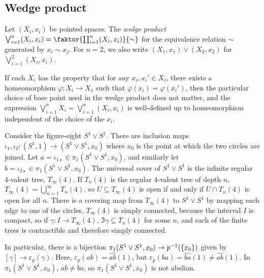 \subsection{Wedge product}
\begin{definition}
	Let \( (X_i, x_i) \) be pointed spaces.
	The \emph{wedge product} \( \bigvee_{i=1}^n (X_i, x_i) = \faktor{\coprod_{i=1}^n (X_i, x_i)}{\sim} \) for the equivalence relation \( \sim \) generated by \( x_i \sim x_j \).
	For \( n = 2 \), we also write \( (X_1, x_1) \vee (X_2, x_2) \) for \( \bigvee_{i=1}^2 (X_i, x_i) \).
\end{definition}
If each \( X_i \) has the property that for any \( x_i, x_i' \in X_i \), there exists a homeomorphism \( \varphi \colon X_i \to X_1 \) such that \( \varphi(x_i) = \varphi(x_i') \), then the particular choice of base point used in the wedge product does not matter, and the expression \( \bigvee_{i=1}^n X_i = \bigvee_{i=1}^n (X_i, x_i) \) is well-defined up to homeomorphism independent of the choice of the \( x_i \).
\begin{example}
	Consider the figure-eight \( S^1 \vee S^1 \).
	There are inclusion maps \( \iota_1, \iota_2 \colon (S^1,1) \to (S^1 \vee S^1, x_0) \) where \( x_0 \) is the point at which the two circles are joined.
	Let \( a = \iota_{1\star} \in \pi_1(S^1 \vee S^1,x_0) \), and similarly let \( b = \iota_{2\star} \in \pi_1(S^1 \vee S^1,x_0) \).
	The universal cover of \( S^1 \vee S^1 \) is the infinite regular 4-valent tree, \( T_\infty(4) \).
	If \( T_n(4) \) is the regular 4-valent tree of depth \( n \), \( T_\infty(4) = \bigcup_{n=1}^\infty T_n(4) \), so \( U \subseteq T_\infty(4) \) is open if and only if \( U \cap T_n(4) \) is open for all \( n \).
	There is a covering map from \( T_\infty(4) \) to \( S^1 \vee S^1 \) by mapping each edge to one of the circles.
	\( T_\infty(4) \) is simply connected, because the interval \( I \) is compact, so if \( \gamma \colon I \to T_\infty(4) \), \( \Im \gamma \subseteq T_n(4) \) for some \( n \), and each of the finite trees is contractible and therefore simply connected.

	In particular, there is a bijection \( \pi_1(S^1 \vee S^1, x_0) \to p^{-1}(\qty{x_0}) \) given by \( [\gamma] \to \varepsilon_p(\gamma) \).
	Here, \( \varepsilon_p(ab) = \widehat{ab}(1) \), but \( \varepsilon_p(ba) = \widehat{ba}(1) \neq \widehat{ab}(1) \).
	In \( \pi_1(S^1 \vee S^1, x_0) \), \( ab \neq ba \), so \( \pi_1(S^1 \vee S^1,x_0) \) is not abelian.
\end{example}

